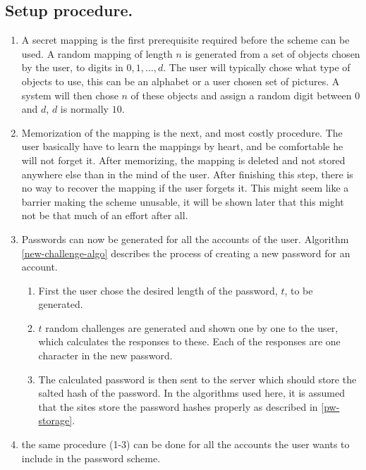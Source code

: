 \subsection{Setup procedure.} 
\begin{enumerate}
    \item A secret mapping is the first prerequisite required before the scheme can be used. A random mapping of length $n$ is generated from a set of objects chosen by the user, to digits in ${0,1,\dots,d}$. The user will typically chose what type of objects to use, this can be an alphabet or a user chosen set of pictures. A system will then chose $n$ of these objects and assign a random digit between $0$ and $d$, $d$ is normally $10$. 
    \item Memorization of the mapping is the next, and most costly procedure. The user basically have to learn the mappings by heart, and be comfortable he will not forget it. After memorizing, the mapping is deleted and not stored anywhere else than in the mind of the user. After finishing this step, there is no way to recover the mapping if the user forgets it. This might seem like a barrier making the scheme unusable, it will be shown later that this might not be that much of an effort after all. 
    \item Passwords can now be generated for all the accounts of the user. Algorithm \ref{new-challenge-algo} describes the process of creating a new password for an account. 
    \begin{enumerate}
        \item First the user chose the desired length of the password, $t$, to be generated. 
        \item $t$ random challenges are generated and shown one by one to the user, which calculates the responses to these. Each of the responses are one character in the new password. 
        \item The calculated password is then sent to the server which should store the salted hash of the password. In the algorithms used here, it is assumed that the sites store the password hashes properly as described in \autoref{pw-storage}. 
    \end{enumerate}
    \item the same procedure (1-3) can be done for all the accounts the user wants to include in the password scheme.
\end{enumerate}

